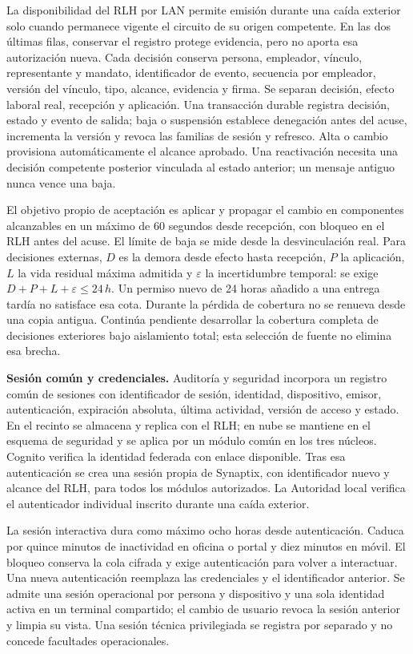 La disponibilidad del RLH por LAN permite emisión durante una caída exterior solo cuando permanece vigente el circuito de su origen competente. En las dos últimas filas, conservar el registro protege evidencia, pero no aporta esa autorización nueva. Cada decisión conserva persona, empleador, vínculo, representante y mandato, identificador de evento, secuencia por empleador, versión del vínculo, tipo, alcance, evidencia y firma. Se separan decisión, efecto laboral real, recepción y aplicación. Una transacción durable registra decisión, estado y evento de salida; baja o suspensión establece denegación antes del acuse, incrementa la versión y revoca las familias de sesión y refresco. Alta o cambio provisiona automáticamente el alcance aprobado. Una reactivación necesita una decisión competente posterior vinculada al estado anterior; un mensaje antiguo nunca vence una baja.

El objetivo propio de aceptación es aplicar y propagar el cambio en componentes alcanzables en un máximo de 60 segundos desde recepción, con bloqueo en el RLH antes del acuse. El límite de baja se mide desde la desvinculación real. Para decisiones externas, \(D\) es la demora desde efecto hasta recepción, \(P\) la aplicación, \(L\) la vida residual máxima admitida y \(\varepsilon\) la incertidumbre temporal: se exige \(D+P+L+\varepsilon\leq24\,h\). Un permiso nuevo de 24 horas añadido a una entrega tardía no satisface esa cota. Durante la pérdida de cobertura no se renueva desde una copia antigua. Continúa pendiente desarrollar la cobertura completa de decisiones exteriores bajo aislamiento total; esta selección de fuente no elimina esa brecha.

\textbf{Sesión común y credenciales.}
Auditoría y seguridad incorpora un registro común de sesiones con identificador de sesión, identidad, dispositivo, emisor, autenticación, expiración absoluta, última actividad, versión de acceso y estado. En el recinto se almacena y replica con el RLH; en nube se mantiene en el esquema de seguridad y se aplica por un módulo común en los tres núcleos. Cognito verifica la identidad federada con enlace disponible. Tras esa autenticación se crea una sesión propia de Synaptix, con identificador nuevo y alcance del RLH, para todos los módulos autorizados. La Autoridad local verifica el autenticador individual inscrito durante una caída exterior.

La sesión interactiva dura como máximo ocho horas desde autenticación. Caduca por quince minutos de inactividad en oficina o portal y diez minutos en móvil. El bloqueo conserva la cola cifrada y exige autenticación para volver a interactuar. Una nueva autenticación reemplaza las credenciales y el identificador anterior. Se admite una sesión operacional por persona y dispositivo y una sola identidad activa en un terminal compartido; el cambio de usuario revoca la sesión anterior y limpia su vista. Una sesión técnica privilegiada se registra por separado y no concede facultades operacionales.

